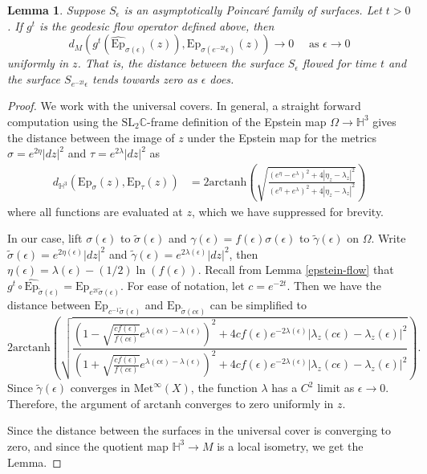 \documentclass{amsart}
\newcommand{\C}{\mathbb{C}}
\renewcommand{\H}{\mathbb{H}}
\newtheorem{lem}[thm]{Lemma}
\begin{document}
\begin{lem}\label{asym-parallel-lemma}
Suppose $S_\epsilon$ is an asymptotically Poincar\'e family of surfaces. 
Let $t > 0$. 
If $g^t$ is the geodesic flow operator defined above, then  
\[
d_M \left(g^t (\widehat{\mathrm{Ep}}_{\sigma(\epsilon)}(z)), \mathrm{Ep}_{\sigma(e^{-2t} \epsilon)}(z) \right) \to 0
\quad \text{ as } \epsilon \to 0
\]
uniformly in $z$. 
That is, the distance between the surface $S_\epsilon$ flowed for time $t$ and the surface $S_{e^{-2t}\epsilon}$ tends towards zero as $\epsilon$ does. 
\end{lem}


\begin{proof}
We work with the universal covers. 
In general, a straight forward computation using the $\mathrm{SL}_2\C$-frame definition of the Epstein  map $\Omega \to \H^3$ gives the distance between the image of $z$ under the Epstein map for the metrics $\sigma = e^{2\eta}|dz|^2$ and $\tau =e^{2\lambda}|dz|^2$ as
\begin{align*}
d_{\H^3} \left( \mathrm{Ep}_{\sigma}(z), \mathrm{Ep}_{\tau}(z) \right)
&= 2 \mathrm{arctanh} \left(\sqrt{ \frac{(e^\eta - e^{\lambda})^2  + 4|\eta_z - \lambda_z|^2}{(e^\eta + e^{\lambda})^2  + 4|\eta_z - \lambda_z|^2}} \right)
\end{align*}
where all functions are evaluated at $z$, which we have suppressed for brevity.

In our case, lift $\sigma(\epsilon)$ to $\tilde{\sigma}(\epsilon)$ and $\gamma(\epsilon) = f(\epsilon)\sigma(\epsilon)$ to $\tilde{\gamma}(\epsilon)$ on $\Omega$. 
Write $\tilde{\sigma}(\epsilon) = e^{2\eta(\epsilon)}|dz|^2$ and $\tilde{\gamma}(\epsilon) = e^{2\lambda(\epsilon)}|dz|^2$, then $\eta(\epsilon) = \lambda(\epsilon) - (1/2)\ln(f(\epsilon))$. 
Recall from Lemma \ref{epstein-flow} that $g^t \circ \widehat{\mathrm{Ep}}_{\tilde{\sigma}(\epsilon)} = \mathrm{Ep}_{e^{2t}\tilde{\sigma}(\epsilon)}$.
For ease of notation, let $c = e^{-2t}$. 
Then we have the distance between $\mathrm{Ep}_{c^{-1} \tilde{\sigma}(\epsilon)}$ and $\mathrm{Ep}_{\tilde{\sigma}(c\epsilon)}$ can be simplified to
\[
2 \mathrm{arctanh} \left(\sqrt{ 
\frac
{(1 - \sqrt{\frac{c f(\epsilon)}{f(c \epsilon)}}e^{\lambda(c\epsilon) - \lambda(\epsilon)})^2 + 4 c f(\epsilon)e^{-2\lambda(\epsilon)}|\lambda_z(c\epsilon) - \lambda_z(\epsilon)|^2}
{(1 + \sqrt{\frac{c f(\epsilon)}{f(c \epsilon)}}e^{\lambda(c\epsilon) - \lambda(\epsilon)})^2 + 4 c f(\epsilon)e^{-2\lambda(\epsilon)}|\lambda_z(c\epsilon) - \lambda_z(\epsilon)|^2}
} \right).
\] 
Since $\tilde{\gamma}(\epsilon)$ converges in $\mathrm{Met}^\infty(X)$, the function $\lambda$ has a $C^2$ limit as $\epsilon \to 0$. 
Therefore, the argument of $\mathrm{arctanh}$ converges to zero uniformly in $z$.

Since the distance between the surfaces in the universal cover is converging to zero, and since the quotient map $\H^3 \to M$ is a local isometry, we get the Lemma. 
\end{proof}
\end{document}
